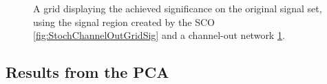\begin{figure}[H]
{\begin{subfigure}{.5\textwidth}
        \vspace{-1cm}
        \caption{}
        \label{fig:ChannelOutGridSig}
    \end{subfigure}
    }
    \caption{A grid displaying the achieved significance on the original signal set, using the signal region 
    created by the \ac{SCO} \ref{fig:StochChannelOutGridSig} and a channel-out network \ref{fig:ChannelOutGridSig}.}
    \label{fig:SCOCO}
\end{figure}

\subsection{Results from the \ac{PCA}}\label{appendix:PCA}
\begin{figure}[H]
\end{figure}
